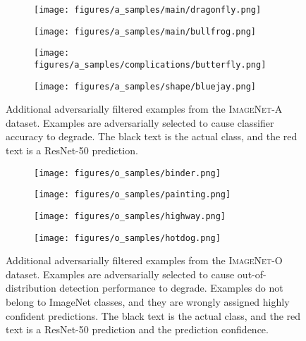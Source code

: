 \documentclass[10pt,twocolumn,letterpaper]{article}
\begin{document}
\begin{figure*}[t]
\centering
\begin{subfigure}{.25\textwidth}
    \centering
    \texttt{[image: figures/a\_samples/main/dragonfly.png]}
\end{subfigure}\begin{subfigure}{.25\textwidth}
    \centering
    \texttt{[image: figures/a\_samples/main/bullfrog.png]}
\end{subfigure}\begin{subfigure}{.25\textwidth}
    \centering
    \texttt{[image: figures/a\_samples/complications/butterfly.png]}
\end{subfigure}\begin{subfigure}{.25\textwidth}
    \centering
    \texttt{[image: figures/a\_samples/shape/bluejay.png]}
\end{subfigure}
\caption{
Additional adversarially filtered examples from the \textsc{ImageNet-A} dataset. Examples are adversarially selected to cause classifier accuracy to degrade. The black text is the actual class, and the red text is a ResNet-50 prediction.
}\label{fig:imagenet-a}
\vspace{5pt}
\begin{subfigure}{.25\textwidth}
    \centering
    \texttt{[image: figures/o\_samples/binder.png]}
\end{subfigure}\begin{subfigure}{.25\textwidth}
    \centering
    \texttt{[image: figures/o\_samples/painting.png]}
\end{subfigure}\begin{subfigure}{.25\textwidth}
    \centering
    \texttt{[image: figures/o\_samples/highway.png]}
\end{subfigure}\begin{subfigure}{.25\textwidth}
    \centering
    \texttt{[image: figures/o\_samples/hotdog.png]}
\end{subfigure}
\caption{
Additional adversarially filtered examples from the \textsc{ImageNet-O} dataset. Examples are adversarially selected to cause out-of-distribution detection performance to degrade. Examples do not belong to ImageNet classes, and they are wrongly assigned highly confident predictions. The black text is the actual class, and the red text is a ResNet-50 prediction and the prediction confidence.
}\label{fig:imagenet-o}
\vspace{-10pt}
\end{figure*} 
\end{document}
